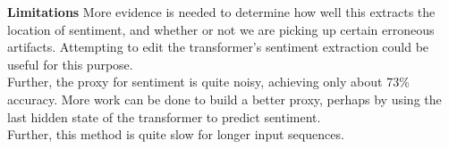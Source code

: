 \documentclass[10pt,a4paper]{report}
\begin{document}
\textbf{Limitations}
More evidence is needed to determine how well this extracts the location of sentiment, and whether or not we are picking up certain erroneous artifacts. Attempting to edit the transformer's sentiment extraction could be useful for this purpose.
\\
Further, the proxy for sentiment is quite noisy, achieving only about 73\% accuracy. More work can be done to build a better proxy, perhaps by using the last hidden state of the transformer to predict sentiment. 
\\
Further, this method is quite slow for longer input sequences. 
\\
\end{document}
